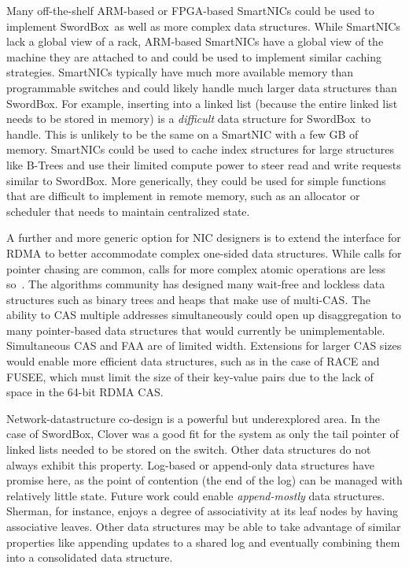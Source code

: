 \documentclass[12pt]{ucsddissertation}
\newcommand{\sword}{SwordBox}
\begin{document}
Many off-the-shelf ARM-based or FPGA-based SmartNICs could be used to implement \sword\ as well as
more complex data structures. While SmartNICs lack a global view of a rack, ARM-based SmartNICs have
a global view of the machine they are attached to and could be used to implement similar caching
strategies. SmartNICs typically have much more available memory than programmable switches and could
likely handle much larger data structures than \sword. For example, inserting into a linked list
(because the entire linked list needs to be stored in memory) is a \textit{difficult} data structure
for \sword\ to handle. This is unlikely to be the same on a SmartNIC with a few GB of memory.
SmartNICs could be used to cache index structures for large structures like B-Trees and use their
limited compute power to steer read and write requests similar to \sword. More generically, they
could be used for simple functions that are difficult to implement in remote memory, such as an
allocator or scheduler that needs to maintain centralized state.

A further and more generic option for NIC designers is to extend the interface for RDMA to better
accommodate complex one-sided data structures. While calls for pointer chasing are common, calls for
more complex atomic operations are less so~\cite{prism, clio}. The algorithms community has designed
many wait-free and lockless data structures such as binary trees and heaps that make use of
multi-CAS. The ability to CAS multiple addresses simultaneously could open up disaggregation to many
pointer-based data structures that would currently be unimplementable. Simultaneous CAS and FAA are
of limited width. Extensions for larger CAS sizes would enable more efficient data structures, such
as in the case of RACE and FUSEE, which must limit the size of their key-value pairs due to the lack
of space in the 64-bit RDMA CAS.

Network-datastructure co-design is a powerful but underexplored area. In the case of \sword, Clover
was a good fit for the system as only the tail pointer of linked lists needed to be stored on the
switch. Other data structures do not always exhibit this property. Log-based or append-only data
structures have promise here, as the point of contention (the end of the log) can be managed with
relatively little state. Future work could enable \textit{append-mostly} data structures. Sherman,
for instance, enjoys a degree of associativity at its leaf nodes by having associative leaves. Other
data structures may be able to take advantage of similar properties like appending updates to a
shared log and eventually combining them into a consolidated data structure.
\end{document}
